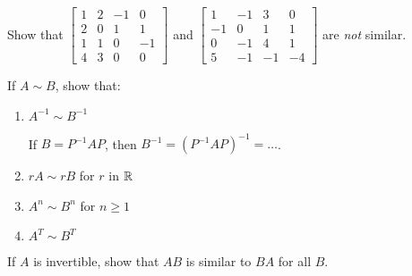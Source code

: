 \documentclass{ximera}
\begin{document}





\begin{problem}\label{prob:notsimilar_4x4}
Show that $\begin{bmatrix}
1 & 2 & -1 &  0 \\
2 & 0 &  1 &  1 \\
1 & 1 &  0 & -1 \\
4 & 3 & 0 & 0
\end{bmatrix}$ and $
\begin{bmatrix}
  1 & -1 &  3 &  0 \\
 -1 &  0 &  1 &  1 \\
  0 & -1 &  4 &  1 \\
  5 & -1 & -1 & -4
\end{bmatrix}$ are \textit{not} similar.
\end{problem}

\begin{problem}\label{prob:similarproperties}
If $A \sim B$, show that:
\begin{enumerate}
\item\label{prob:similarproperties_inverses} $A^{-1} \sim B^{-1}$
\begin{hint}
If $B = P^{-1}AP$, then $B^{-1} = (P^{-1}AP)^{-1} = \ldots$.
\end{hint}
\item\label{prob:similarproperties_scalars} $rA \sim rB$ for $r$ in $\mathbb{R}$
\item\label{prob:similarproperties_powers} $A^{n} \sim B^{n}$ for $n \geq 1$
\item\label{prob:similarproperties_transposes} $A^{T} \sim B^{T}$
\end{enumerate}
\end{problem}

\begin{problem}\label{prob:similarproperties_invertible}
If $A$ is invertible, show that $AB$ is similar to $BA$ for all $B$.
\end{problem}
\end{document}
